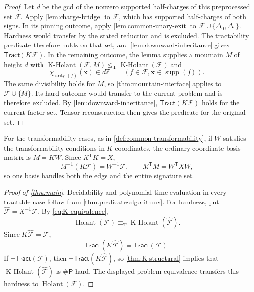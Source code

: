 \documentclass[11pt,letterpaper,onecolumn]{article}
\theoremstyle{plain}
\theoremstyle{definition}
\theoremstyle{remark}
\newcommand{\cF}{\mathcal F}
\newcommand{\Holant}{\operatorname{Holant}}
\newcommand{\KHolant}{\operatorname{K\text{-}Holant}}
\newcommand{\Tract}{\mathsf{Tract}}
\newcommand{\SharpP}{\#\mathsf P}
\newcommand{\supp}{\operatorname{supp}}
\newcommand{\arity}{\operatorname{arity}}
\newcommand{\DeltaZero}{\Delta_0}
\newcommand{\DeltaOne}{\Delta_1}
\newcommand{\leT}{\leq_{\mathrm T}}
\newcommand{\equivT}{\equiv_{\mathrm T}}
\begin{document}
\begin{proof}
		Let \(d\) be the gcd of the nonzero supported half-charges of this
		preprocessed set \(\cF\).
        Apply \cref{lem:charge-bridge} to \(\cF\), which has supported
        half-charges of both signs. In
		its pinning outcome, apply \cref{lem:common-unary-exit} to
		\(\cF\cup\{\DeltaZero,\DeltaOne\}\). Hardness would transfer by
		the stated reduction and is excluded. The tractability predicate therefore
		holds on that set, and \cref{lem:downward-inheritance} gives
		\(\Tract(K\cF)\).  In the remaining outcome,
		the lemma supplies a mountain \(M\) of height \(d\) with
		\(\KHolant(\cF,M)\leT\KHolant(\cF)\) and
		\[
		\chi_{\arity(f)}({\mathbf x})\in d\mathbb Z
		\qquad(f\in\cF, {\mathbf x}\in\supp(f)).
		\]
		The same divisibility holds for \(M\), so \cref{thm:mountain-interface}
		applies to \(\cF\cup\{M\}\).  Its hard outcome would transfer to the
		current problem and is therefore excluded.  By
		\cref{lem:downward-inheritance}, \(\Tract(K\cF)\) holds for the current
		factor set. Tensor reconstruction then gives the predicate for the original set.
	\end{proof}
	
		For the transformability cases, as in \cref{def:common-transformability}, if \(W\) satisfies the transformability
		conditions in \(K\)-coordinates, the ordinary-coordinate basis matrix is \(M=KW\).  Since
		\(K^{\mathsf T}K=X\),
		\begin{equation*}
			M^{-1}(K\cF)=W^{-1}\cF,
			\qquad M^{\mathsf T}M=W^{\mathsf T}XW,
		\end{equation*}
		so one basis handles both the edge and the entire signature set.

	\begin{proof}[Proof of \cref{thm:main}]
		Decidability and polynomial-time evaluation in every tractable case follow
		from \cref{thm:predicate-algorithms}.  For hardness, put
		\(\widehat{\cF}=K^{-1}\cF\).  By \cref{eq:K-equivalence},
		\begin{equation*}
			\Holant(\cF)\equivT\KHolant(\widehat{\cF}).
		\end{equation*}
		Since \(K\widehat{\cF}=\cF\),
\begin{equation*}
\Tract(K\widehat{\cF})=\Tract(\cF).
\end{equation*}
		If \(\neg\Tract(\cF)\), then \(\neg\Tract(K\widehat{\cF})\), so
		\cref{thm:K-structural} implies that \(\KHolant(\widehat{\cF})\) is
		\(\SharpP\)-hard.  The displayed problem equivalence transfers this
        hardness to \(\Holant(\cF)\).
	\end{proof}
	
\end{document}
